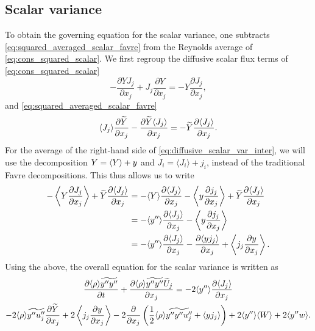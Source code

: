\documentclass[oneside,a4paper,11pt]{report}
\begin{document}
\subsection{Scalar variance}
To obtain the governing equation for the scalar variance, one subtracts \cref{eq:squared_averaged_scalar_favre} from the Reynolds average of \cref{eq:cons_squared_scalar}. We first regroup the diffusive scalar flux terms of \cref{eq:cons_squared_scalar}
\begin{equation}
    \label{eq:diffusive_scalar_var_inter}
    -\frac{\partial Y J_j}{\partial x_j} + J_j \frac{\partial Y}{\partial x_j} = -Y \frac{\partial J_j}{\partial x_j},
\end{equation}
and \cref{eq:squared_averaged_scalar_favre}
\begin{equation}
    \langle J_j \rangle \frac{\partial \widetilde{Y}}{\partial x_j} - \frac{\partial \widetilde{Y} \langle J_j \rangle}{\partial x_j} = -\widetilde{Y} \frac{\partial \langle J_j \rangle}{\partial x_j}.
\end{equation}
For the average of the right-hand side of \cref{eq:diffusive_scalar_var_inter}, we will use the decomposition $Y = \langle Y \rangle + y$ and $J_i = \langle J_i \rangle + j_i$, instead of the traditional Favre decompositions. This thus allows us to write
\begin{align}
    -\left < Y \frac{\partial J_j}{\partial x_j} \right > + \widetilde{Y} \frac{\partial \langle J_j \rangle}{\partial x_j} &= -\langle Y \rangle \frac{\partial \langle J_j \rangle}{\partial x_j} - \left < y \frac{\partial j_j}{\partial x_j} \right > + \widetilde{Y} \frac{\partial \langle J_j \rangle}{\partial x_j} \nonumber \\
    &= -\langle y'' \rangle \frac{\partial \langle J_j \rangle}{\partial x_j} - \left < y \frac{\partial j_j}{\partial x_j} \right > \nonumber \\
    &= -\langle y'' \rangle \frac{\partial \langle J_j \rangle}{\partial x_j} - \frac{\partial \langle y j_j \rangle}{\partial x_j} + \left < j_j \frac{\partial y}{\partial x_j} \right >.
\end{align}
Using the above, the overall equation for the scalar variance is written as
\begin{multline}
    \label{eq:scalar_variance_favre}
    \frac{\partial \langle \rho \rangle \widetilde{y'' y''}}{\partial t} + \frac{\partial \langle \rho \rangle \widetilde{y'' y''} \widetilde{U}_j }{\partial x_j} = -2 \langle y'' \rangle \frac{\partial \langle J_j \rangle }{\partial x_j} \\
    -2 \langle \rho \rangle \widetilde{y'' u_j''} \frac{\partial \widetilde{Y}}{\partial x_j} + 2 \left < j_j \frac{\partial y}{\partial x_j} \right > - 2 \frac{\partial}{\partial x_j} \left ( \frac{1}{2} \langle \rho \rangle \widetilde{y'' y'' u_j''} +  \langle y j_j \rangle \right) + 2 \langle y'' \rangle \langle W \rangle + 2 \langle y'' w \rangle.
\end{multline}
\end{document}
